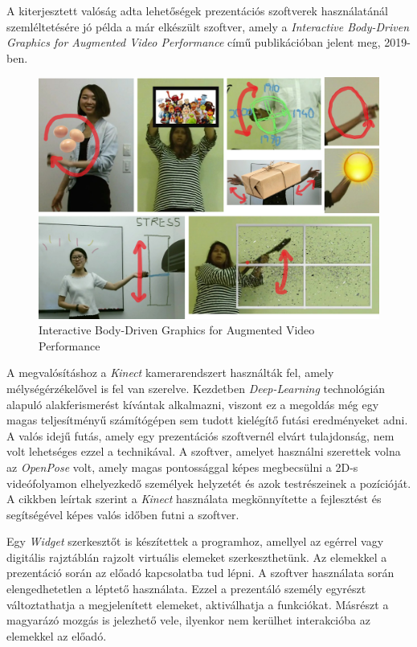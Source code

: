 A kiterjesztett valóság adta lehetőségek prezentációs szoftverek használatánál szemléltetésére jó példa a már elkészült szoftver, amely a \textit{Interactive Body-Driven Graphics for Augmented Video Performance} című publikációban jelent meg, 2019-ben. \cite{saquib2019interactive}

\begin{figure}[h]
\centering
\includegraphics[width=10truecm, height=7.14truecm]{images/IBDGAVP.png}
\caption{Interactive Body-Driven Graphics for Augmented Video Performance}
\label{fig:ibdgavp}
\end{figure}

A megvalósításhoz a \textit{Kinect} kamerarendszert használták fel, amely mélységérzékelővel is fel van szerelve.
Kezdetben \textit{Deep-Learning} technológián alapuló alakferismerést kívántak alkalmazni, viszont ez a megoldás még egy magas teljesítményű számítógépen sem tudott kielégítő futási eredményeket adni. A valós idejű futás, amely egy prezentációs szoftvernél elvárt tulajdonság, nem volt lehetséges ezzel a technikával. A szoftver, amelyet használni szerettek volna az \textit{OpenPose} volt, amely magas pontossággal képes megbecsülni a 2D-s videófolyamon elhelyezkedő személyek helyzetét és azok testrészeinek a pozícióját. \cite{cao2018openpose}
A cikkben leírtak szerint a \textit{Kinect} használata megkönnyítette a fejlesztést és segítségével képes valós időben futni a szoftver.

Egy \textit{Widget} szerkesztőt is készítettek a programhoz, amellyel az egérrel vagy digitális rajztáblán rajzolt virtuális elemeket szerkeszthetünk. Az elemekkel a prezentáció során az előadó kapcsolatba tud lépni. A szoftver használata során elengedhetetlen a léptető használata. Ezzel a prezentáló személy egyrészt változtathatja a megjelenített elemeket, aktiválhatja a funkciókat. Másrészt a magyarázó mozgás is jelezhető vele, ilyenkor nem kerülhet interakcióba az elemekkel az előadó.

